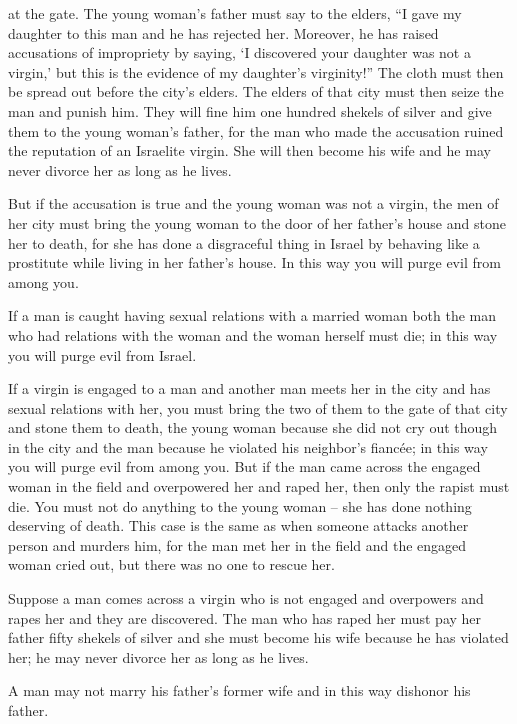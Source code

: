 {at the gate.
The young
woman’s
father
must say
to
the elders,
“I gave
my daughter
to this
man
and he has rejected
her.
Moreover,
he has raised accusations
of impropriety by
saying,
‘I discovered
your daughter
was not
a virgin,’
but this
is the evidence
of my daughter’s
virginity!” The cloth
must then be spread
out before
the city’s
elders.
The elders
of that city
must then seize
the man
and punish him.
They will fine
him one hundred
shekels of silver
and give
them to the young woman’s
father,
for
the man who made
the accusation
ruined the reputation
of an Israelite
virgin.
She will then become
his wife
and he may never
divorce
her as long as
he lives.
\par }{\PP {}But if
the accusation
is true
and the young woman
was
not
a virgin,
the men
of her city
must bring
the young
woman to
the door
of her father’s
house
and stone
her to
death,
for
she has done
a disgraceful thing
in Israel
by behaving like a prostitute
while living in her father’s
house.
In this way you will purge
evil
from among you.
\par }{\PP {}If
a man
is caught
having sexual
relations with
a married
woman
both
the man
who had relations
with
the woman
and the woman
herself
must die;
in this way you will purge
evil
from Israel.
\par }{\PP {}If
a virgin
is engaged
to a man
and another man
meets
her in the city
and has sexual relations
with her,
you must bring
the two
of them to
the gate
of that city
and stone
them to death,
the young woman
because she did not
cry out
though in the city
and the man
because he violated
his neighbor’s
fiancée;
in this way you will purge
evil
from among you.
But if
the man
came across
the engaged
woman
in the field
and overpowered
her and raped
her, then only the rapist
must die.
You must not
do
anything
to the young woman – she has done nothing deserving of death. This case is the same as when someone attacks another person and murders him,
for
the man met
her in the field
and the engaged
woman
cried out,
but there was no
one to rescue her.
\par }{\PP {}Suppose
a man
comes across
a virgin
who
is not
engaged
and overpowers
and rapes
her and they are discovered.
The man
who has raped
her must pay
her
father
fifty
shekels of silver
and she must become
his wife
because
he has violated
her; he may
never
divorce
her as long as he lives.
\par }{\PP {}A man
may not
marry
his father’s
former wife
and in this way dishonor
his father.

}
